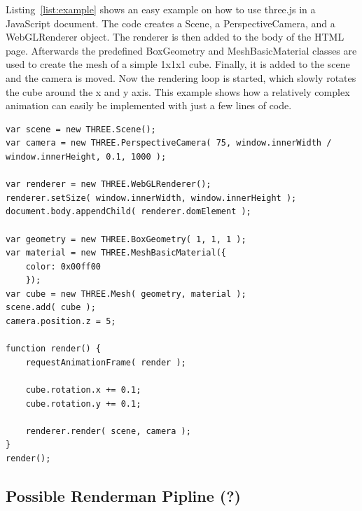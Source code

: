 Listing~\ref{list:example} shows an easy example on how to use three.js in a JavaScript document. The code creates a Scene, a PerspectiveCamera, and a WebGLRenderer object. The renderer is then added to the body of the HTML page. Afterwards the predefined BoxGeometry and MeshBasicMaterial classes are used to create the mesh of a simple 1x1x1 cube. Finally, it is added to the scene and the camera is moved. Now the rendering loop is started, which slowly rotates the cube around the x and y axis. This example shows how a relatively complex animation can easily be implemented with just a few lines of code.
\lstset{
caption=Three.js Example,
label=list:example}
\begin{lstlisting}
var scene = new THREE.Scene();
var camera = new THREE.PerspectiveCamera( 75, window.innerWidth / window.innerHeight, 0.1, 1000 );

var renderer = new THREE.WebGLRenderer();
renderer.setSize( window.innerWidth, window.innerHeight );
document.body.appendChild( renderer.domElement );

var geometry = new THREE.BoxGeometry( 1, 1, 1 );
var material = new THREE.MeshBasicMaterial({
	color: 0x00ff00
	});
var cube = new THREE.Mesh( geometry, material );
scene.add( cube );
camera.position.z = 5;

function render() {
	requestAnimationFrame( render );
	
	cube.rotation.x += 0.1;
	cube.rotation.y += 0.1;

	renderer.render( scene, camera );
}
render();
\end{lstlisting}

\subsection{Possible Renderman Pipline (?)}
